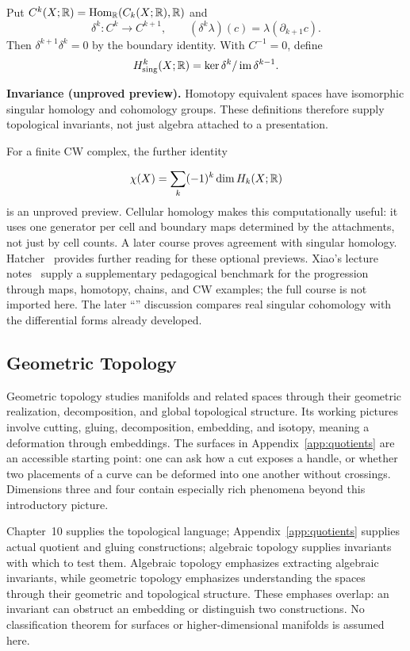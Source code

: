 \begin{definition}
Put $C^k(X;\mathbb{R})=\operatorname{Hom}_{\mathbb{R}}(C_k(X;\mathbb{R}),\mathbb{R})$ and
\[
\delta^k:C^k\to C^{k+1},\qquad
(\delta^k\lambda)(c)=\lambda(\partial_{k+1}c).
\]
Then $\delta^{k+1}\delta^k=0$ by the boundary identity. With $C^{-1}=0$, define
\[
H^k_{\mathrm{sing}}(X;\mathbb{R})=\ker\delta^k/\operatorname{im}\delta^{k-1}.
\]
\end{definition}
\textbf{Invariance (unproved preview).} Homotopy equivalent spaces have
isomorphic singular homology and cohomology groups. These definitions
therefore supply topological invariants, not just algebra attached to a presentation.

For a finite CW complex, the further identity

\[
\chi(X)=\sum_k(-1)^k\dim H_k(X;\mathbb{R})
\]
 is an unproved preview.
Cellular homology makes this computationally useful: it uses one generator
per cell and boundary maps determined by the attachments, not just by cell
counts. A later course proves agreement with singular homology.
Hatcher~\cite{hatcher-topology} provides further reading for these optional
previews. Xiao's lecture notes~\cite{xiao-topology-notes} supply a supplementary
pedagogical benchmark for the progression through maps, homotopy, chains,
and CW examples; the full course is not imported here.
The later ``'' discussion compares
real singular cohomology with the differential forms already developed.

\subsection*{Geometric Topology}

\label{sec:geometric-topology-preview}
Geometric topology studies manifolds and related spaces through their
geometric realization, decomposition, and global topological structure.
Its working pictures involve cutting, gluing, decomposition, embedding,
and isotopy, meaning a deformation through embeddings. The surfaces in
Appendix~\ref{app:quotients} are an accessible starting point: one can
ask how a cut exposes a handle, or whether two placements of a curve can
be deformed into one another without crossings. Dimensions three and four
contain especially rich phenomena beyond this introductory picture.

Chapter~10 supplies the topological language; Appendix~\ref{app:quotients} supplies actual
quotient and gluing constructions; algebraic topology supplies invariants
with which to test them. Algebraic topology emphasizes extracting algebraic
invariants, while geometric topology emphasizes understanding the spaces
through their geometric and topological structure. These emphases overlap:
an invariant can obstruct an embedding or distinguish two constructions.
No classification theorem for surfaces or higher-dimensional manifolds is
assumed here.

